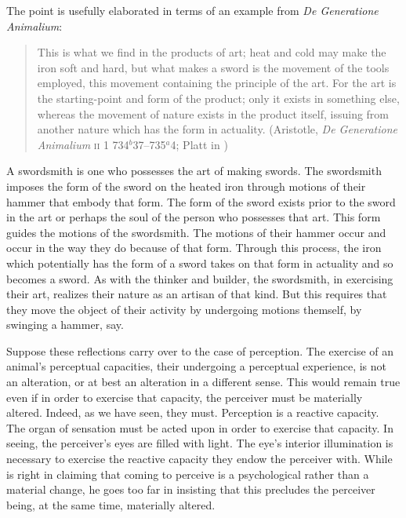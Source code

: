 The point is usefully elaborated in terms of an example from \emph{De Generatione Animalium}:
\begin{quote}
	This is what we find in the products of art; heat and cold may make the iron soft and hard, but what makes a sword is the movement of the tools employed, this movement containing the principle of the art. For the art is the starting-point and form of the product; only it exists in something else, whereas the movement of nature exists in the product itself, issuing from another nature which has the form in actuality. (Aristotle, \emph{De Generatione Animalium} \textsc{ii} 1 734\( ^{b} \)37--735\( ^{a} \)4; Platt in \citealt[38]{Barnes:1984uq})
\end{quote}
A swordsmith is one who possesses the art of making swords. The swordsmith imposes the form of the sword on the heated iron through motions of their hammer that embody that form. The form of the sword exists prior to the sword in the art or perhaps the soul of the person who possesses that art. This form guides the motions of the swordsmith. The motions of their hammer occur and occur in the way they do because of that form. Through this process, the iron which potentially has the form of a sword takes on that form in actuality and so becomes a sword. As with the thinker and builder, the swordsmith, in exercising their art, realizes their nature as an artisan of that kind. But this requires that they move the object of their activity by undergoing motions themself, by swinging a hammer, say. 

Suppose these reflections carry over to the case of perception. The exercise of an animal's perceptual capacities, their undergoing a perceptual experience, is not an alteration, or at best an alteration in a different sense. This would remain true even if in order to exercise that capacity, the perceiver must be materially altered. Indeed, as we have seen, they must. Perception is a reactive capacity. The organ of sensation must be acted upon in order to exercise that capacity. In seeing, the perceiver's eyes are filled with light. The eye's interior illumination is necessary to exercise the reactive capacity they endow the perceiver with. While \citet{Burnyeat:1992fk} is right in claiming that coming to perceive is a psychological rather than a material change, he goes too far in insisting that this precludes the perceiver being, at the same time, materially altered.


